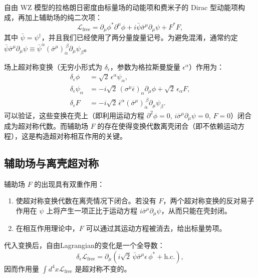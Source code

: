 自由 WZ 模型的拉格朗日密度由标量场的动能项和费米子的 Dirac 型动能项构成，再加上辅助场的纯二次项：
\begin{equation}
\mathcal{L}_{\text{free}} = \partial_\mu \phi^\ast \partial^\mu \phi + i \bar\psi \bar\sigma^\mu \partial_\mu \psi + F^\ast F,
\label{eq:wz_free}
\end{equation}
其中 $\bar\psi = \psi^\dagger$，并且我们已经使用了两分量旋量记号。为避免混淆，通常约定 $\bar\psi \bar\sigma^\mu \partial_\mu \psi \equiv \bar\psi^{\dot\alpha} (\bar\sigma^\mu)_{\dot\alpha}^{\ \beta} \partial_\mu \psi_\beta$。

场上超对称变换（无穷小形式为 $\delta_\epsilon$，参数为格拉斯曼旋量 $\epsilon^\alpha$）作用为：
\begin{align}
\delta_\epsilon \phi &= \sqrt{2} \, \epsilon^\alpha \psi_\alpha, \label{eq:tr_phi} \\
\delta_\epsilon \psi_\alpha &= -i\sqrt{2} \, (\sigma^\mu \bar\epsilon)_\alpha \partial_\mu \phi + \sqrt{2} \, \epsilon_\alpha F, \label{eq:tr_psi} \\
\delta_\epsilon F &= -i\sqrt{2} \, \bar\epsilon^{\dot\alpha} (\bar\sigma^\mu)_{\dot\alpha}^{\ \beta} \partial_\mu \psi_\beta. \label{eq:tr_f}
\end{align}
可以验证，这些变换在壳上（即利用运动方程 $\partial^2\phi = 0$, $i\bar\sigma^\mu\partial_\mu\psi=0$, $F=0$）闭合成为超对称代数。而辅助场 $F$ 的存在使得变换代数离壳闭合（即不依赖运动方程），这是构造超对称相互作用的关键。

\subsection*{辅助场与离壳超对称}

辅助场 $F$ 的出现具有双重作用：
\begin{enumerate}
\item 使超对称变换代数在离壳情况下闭合。若没有 $F$，两个超对称变换的反对易子作用在 $\psi$ 上将产生一项正比于运动方程 $i\bar\sigma^\mu\partial_\mu\psi$，从而只能在壳封闭。
\item 在相互作用理论中，$F$ 可以通过其运动方程被消去，给出标量势项。
\end{enumerate}

代入变换后，自由Lagrangian的变化是一个全导数：
\begin{equation}
\delta_\epsilon \mathcal{L}_{\text{free}} = \partial_\mu \left( i \sqrt{2} \, \bar\psi \bar\sigma^\mu \epsilon \, \phi^\ast + \text{h.c.} \right),
\end{equation}
因而作用量 $\int d^4x \mathcal{L}_{\text{free}}$ 是超对称不变的。

